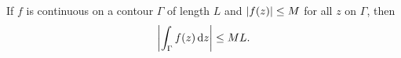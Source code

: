 \begin{theorem}[$ML$-inequality]\label{thm:ml-inequality}
  If $f$ is continuous on a contour $\Gamma$ of length $L$ and
  $\abs{f(z)} \leq M$ for all $z$ on $\Gamma$, then
  \[
    \abs*{\int_\Gamma f(z) \dd z} \leq ML.
  \]
\end{theorem}
